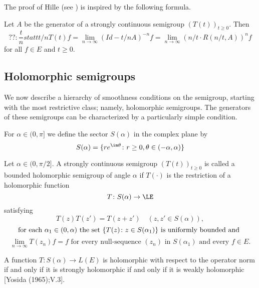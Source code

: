 The proof of Hille (see \citet{kato:1966}) is inspired by the following formula.
\begin{proposition}\label{prop:a2-1.10}
Let $A$ be the generator of a strongly continuous semigroup $(T(t))_{t \geq 0}$.
Then
\begin{equation}\label{eq:a2-1.3}
  ?? : \frac{t}{n} statt t/n 
    T(t)f = \lim_{n \to \infty} (Id - t/nA)^{-n} f = \lim_{n \to \infty} (n/t \cdot R(n/t,A))^{n} f
\end{equation}
for all $f \in E$ and $t \geq 0$.
\end{proposition}
\subsection{Holomorphic semigroups} \label{subsec:a2-1.se4}

We now describe a hierarchy of smoothness conditions on the semigroup, starting with the most restrictive class; namely, holomorphic semigroups.
The generators of these semigroups can be characterized by a particularly simple condition.

For $\alpha \in (0,\pi]$ we define the sector $S(\alpha)$ in the complex plane by
\[
    S(\alpha) = \{re^{\im\theta} \colon r \geq 0, \theta \in (-\alpha,\alpha)\}
\]

\begin{definition}\label{def:a2-1.11}
Let $\alpha \in (0,\pi/2]$.
A strongly continuous semigroup $(T(t))_{t \geq 0}$ is called a bounded holomorphic semigroup of angle $\alpha$ if $T(\cdot)$ is the restriction of a holomorphic function
\[
    T \colon S(\alpha) \to \LE
\]
satisfying
\begin{equation}\label{eq:a2-1.4}
    T(z)T(z') = T(z+z') \quad (z,z' \in S(\alpha)),
\end{equation}
\[
    \text{for each } \alpha_{1} \in (0,\alpha) \text{ the set } \{T(z) \colon z \in S(\alpha_{1})\} \text{ is uniformly bounded and }\\
\]
\begin{equation}\label{eq:a2-1.5}
     \lim_{n \to \infty} T(z_{n})f = f \text{ for every null-sequence } (z_{n}) \text{ in } S(\alpha_{1}) \text{ and every } f \in E.
\end{equation}
\end{definition}

\begin{remark*}\label{rem:a2-1.5-kgk}
A function $T \colon S(\alpha) \to L(E)$ is holomorphic with respect to the operator norm if and only if it is strongly holomorphic if and only if it is weakly holomorphic [Yosida (1965);V.3].
\end{remark*}

